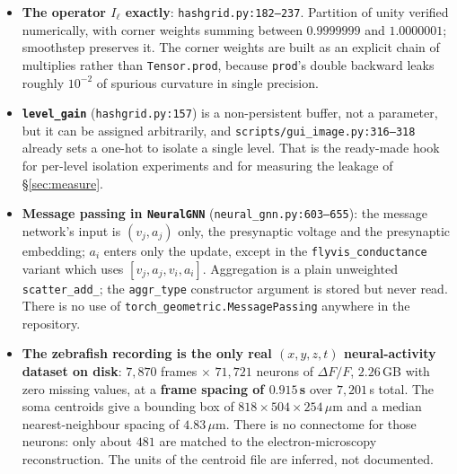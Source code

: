 \documentclass[11pt,a4paper]{article}
\begin{document}
\begin{itemize}[leftmargin=1.4em,itemsep=3pt]
\item \textbf{The operator $I_\ell$ exactly}: \texttt{hashgrid.py:182--237}. Partition of
unity verified numerically, with corner weights summing between $0.9999999$ and $1.0000001$;
smoothstep preserves it. The corner weights are built as an explicit chain of multiplies
rather than \texttt{Tensor.prod}, because \texttt{prod}'s double backward leaks roughly
$10^{-2}$ of spurious curvature in single precision.
\item \textbf{\texttt{level\_gain}} (\texttt{hashgrid.py:157}) is a non-persistent buffer,
not a parameter, but it can be assigned arbitrarily, and \texttt{scripts/gui\_image.py:316--318}
already sets a one-hot to isolate a single level. That is the ready-made hook for per-level
isolation experiments and for measuring the leakage of \S\ref{sec:measure}.
\item \textbf{Message passing in \texttt{NeuralGNN}} (\texttt{neural\_gnn.py:603--655}): the
message network's input is $(v_j, a_j)$ only, the presynaptic voltage and the presynaptic
embedding; $a_i$ enters only the update, except in the \texttt{flyvis\_conductance} variant
which uses $[v_j, a_j, v_i, a_i]$. Aggregation is a plain unweighted \texttt{scatter\_add\_};
the \texttt{aggr\_type} constructor argument is stored but never read. There is no use of
\texttt{torch\_geometric.MessagePassing} anywhere in the repository.
\item \textbf{The zebrafish recording is the only real $(x,y,z,t)$ neural-activity dataset on
disk}: $7{,}870$ frames $\times$ $71{,}721$ neurons of $\Delta F/F$, $2.26$\,GB with zero
missing values, at a \textbf{frame spacing of $0.915$\,s} over $7{,}201$\,s total. The soma
centroids give a bounding box of $818 \times 504 \times 254\,\mu$m and a median
nearest-neighbour spacing of $4.83\,\mu$m. There is no connectome for those neurons: only
about $481$ are matched to the electron-microscopy reconstruction. The units of the centroid
file are inferred, not documented.
\end{itemize}
\end{document}
